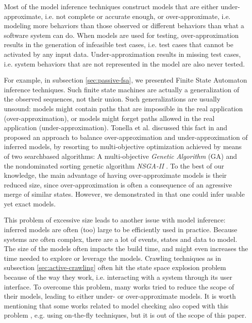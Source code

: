 Most of the model inference techniques construct models that are
either under-approximate, i.e. not complete or accurate enough,
or over-approximate, i.e. modeling more behaviors than those
observed or different behaviors than what a software system can
do. When models are used for testing, over-approximation results
in the generation of infeasible test cases, i.e.  test cases that
cannot be activated by any input data.  Under-approximation
results in missing test cases, i.e. system behaviors that are not
represented in the model are also never tested.

For example, in subsection \ref{sec:passive-fsa}, we presented
Finite State Automaton inference techniques. Such finite state
machines are actually a generalization of the observed sequences,
not their union. Such generalizations are usually unsound: models
might contain paths that are impossible in the real application
(over-approximation), or models might forget paths allowed in the
real application (under-approximation). Tonella et al. discussed
this fact in \cite{tonella2012finding} and proposed an approach
to balance over-approximation and under-approximation of inferred
models, by resorting to multi-objective optimization achieved by
means of two searchbased algorithms: A multi-objective
\textit{Genetic Algorithm} (GA) and the nondominated sorting
genetic algorithm \textit{NSGA-II}
\cite{Srinivas94multiobjectiveoptimization}. To the best of our
knowledge, the main advantage of having over-approximate models
is their reduced size, since over-approximation is often a
consequence of an agressive merge of similar states. However, we
demonstrated in
\cite{DBLP:conf/soict/DurandS14,DBLP:conf/fm/DurandS15,DBLP:conf/debs/SalvaD15}
that one could infer usable yet exact models.

This problem of excessive size leads to another issue with model
inference: inferred models are often (too) large to be
efficiently used in practice. Because systems are often complex,
there are a lot of events, states and data to model. The size of
the models often impacts the build time, and might even increases
the time needed to explore or leverage the models.
Crawling techniques as in subsection \ref{sec:active-crawling}
often hit the state space explosion problem because of the way
they work, i.e. interacting with a system through its user
interface. To overcome this problem, many works tried to reduce
the scope of their models, leading to either under- or
over-approximate models. It is worth mentioning that some works
related to model checking also coped with this problem
\cite{rafe2013survey}, e.g. using on-the-fly techniques, but it
is out of the scope of this paper.

